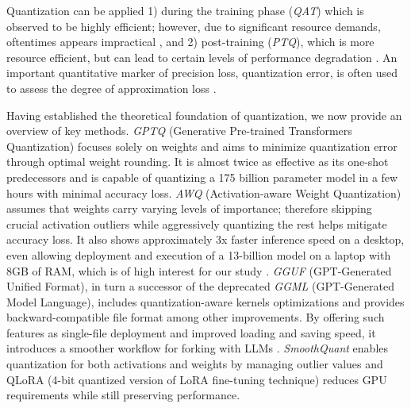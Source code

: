 \documentclass[conference]{IEEEtran}
\begin{document}
Quantization can be applied 1) during the training phase (\textit{QAT}) which is observed to be highly efficient; however, due to significant resource demands, oftentimes appears impractical \cite{chen2024EfficientQAT}, and 2) post-training (\textit{PTQ}), which is more resource efficient, but can lead to certain levels of performance degradation \cite{shen2024exploring}. An important quantitative marker of precision loss, quantization error, is often used to assess the degree of approximation loss \cite{lin2024AWQ}.

Having established the theoretical foundation of quantization, we now provide an overview of key methods. \textit{GPTQ} (Generative Pre-trained Transformers Quantization) focuses solely on weights and aims to minimize quantization error through optimal weight rounding. It is almost twice as effective as its one-shot predecessors and is capable of quantizing a 175 billion parameter model in a few hours with minimal accuracy loss\cite{frantar2023GPTQ}. \textit{AWQ} (Activation-aware Weight Quantization) assumes that weights carry varying levels of importance; therefore skipping crucial activation outliers while aggressively quantizing the rest helps mitigate accuracy loss. It also shows approximately 3x faster inference speed on a desktop, even allowing deployment and execution of a 13-billion model on a laptop with 8GB of RAM, which is of high interest for our study \cite{lin2024AWQ}. \textit{GGUF} (GPT-Generated Unified Format), in turn a successor of the deprecated \textit{GGML} (GPT-Generated Model Language), includes  quantization-aware kernels optimizations and  provides backward-compatible file format among other improvements. By offering such features as single-file deployment and improved loading and saving speed, it introduces a smoother workflow for forking with LLMs \cite{rajput2024benchmarking}. \textit{SmoothQuant} \cite{xiao2023SmoothQuant} enables quantization for both activations and weights by managing outlier values and QLoRA (4-bit quantized version of LoRA fine-tuning technique) \cite{dettmers2023qlora} reduces GPU requirements while still preserving performance.

\end{document}

